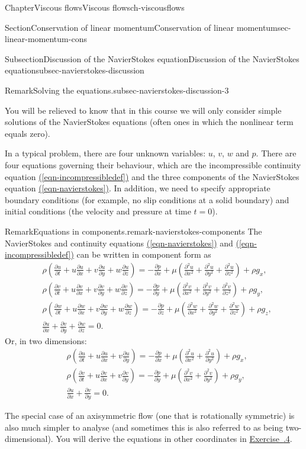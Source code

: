 \documentclass[oneside,10pt,]{book}
\newcommand{\xreffont}{\relax}
\numberwithin{equation}{section}
\newcommand{\pd}[2]{\frac{\partial#1}{\partial#2}}
\begin{document}
\begin{chapterptx}{Chapter}{Viscous flows}{}{Viscous flows}{}{}{ch-viscousflows}
\begin{sectionptx}{Section}{Conservation of linear momentum}{}{Conservation of linear momentum}{}{}{sec-linear-momentum-cons}
\begin{subsectionptx}{Subsection}{Discussion of the Navier\textendash{}Stokes equation}{}{Discussion of the Navier\textendash{}Stokes equation}{}{}{subsec-navierstokes-discussion}
\begin{remark}{Remark}{Solving the equations.}{subsec-navierstokes-discussion-3}
\par
You will be relieved to know that in this course we will only consider simple solutions of the Navier\textendash{}Stokes equations (often ones in which the nonlinear term equals zero).%
\par
In a typical problem, there are four unknown variables: \(u\), \(v\), \(w\) and \(p\). There are four equations governing their behaviour, which are the incompressible continuity equation \hyperref[eqn-incompressibledef]{({\xreffont\ref{eqn-incompressibledef}})} and the three components of the Navier\textendash{}Stokes equation \hyperref[eqn-navierstokes]{({\xreffont\ref{eqn-navierstokes}})}. In addition, we need to specify appropriate boundary conditions (for example, no slip conditions at a solid boundary) and initial conditions (the velocity and pressure at time \(t=0\)).%
\end{remark}
\begin{remark}{Remark}{Equations in components.}{remark-navierstokes-components}%
The Navier\textendash{}Stokes and continuity equations \hyperref[eqn-navierstokes]{({\xreffont\ref{eqn-navierstokes}})} and \hyperref[eqn-incompressibledef]{({\xreffont\ref{eqn-incompressibledef}})} can be written in component form as%
\begin{align*}
&\rho\left(\pd{u}{t}+u\pd{u}{x}+v\pd{u}{y}+w\pd{u}{z}\right)=-\pd{p}{x}+\mu\left(\pd{^2u}{x^2}+\pd{^2u}{y^2}+\pd{^2u}{z^2}\right)+\rho g_x,\\
&\rho\left(\pd{v}{t}+u\pd{v}{x}+v\pd{v}{y}+w\pd{v}{z}\right)=-\pd{p}{y}+\mu\left(\pd{^2v}{x^2}+\pd{^2v}{y^2}+\pd{^2v}{z^2}\right)+\rho g_y,\\
&\rho\left(\pd{w}{t}+u\pd{w}{x}+v\pd{w}{y}+w\pd{w}{z}\right)=-\pd{p}{z}+\mu\left(\pd{^2w}{x^2}+\pd{^2w}{y^2}+\pd{^2w}{z^2}\right)+\rho g_z,\\
&\pd{u}{x}+\pd{v}{y}+\pd{w}{z}=0.
\end{align*}
Or, in two dimensions:%
\begin{align*}
&\rho\left(\pd{u}{t}+u\pd{u}{x}+v\pd{u}{y}\right)=-\pd{p}{x}+\mu\left(\pd{^2u}{x^2}+\pd{^2u}{y^2}\right)+\rho g_x,\\
&\rho\left(\pd{v}{t}+u\pd{v}{x}+v\pd{v}{y}\right)=-\pd{p}{y}+\mu\left(\pd{^2v}{x^2}+\pd{^2v}{y^2}\right)+\rho g_y,\\
&\pd{u}{x}+\pd{v}{y}=0.
\end{align*}
%
\par
The special case of an axisymmetric flow (one that is rotationally symmetric) is also much simpler to analyse (and sometimes this is also referred to as being two-dimensional). You will derive the equations in other coordinates in \hyperlink{ps-polar-coordinates}{Exercise~{\xreffont 7.6.4}}.%

\end{remark}
\end{subsectionptx}
\end{sectionptx}
\end{chapterptx}
\end{document}
